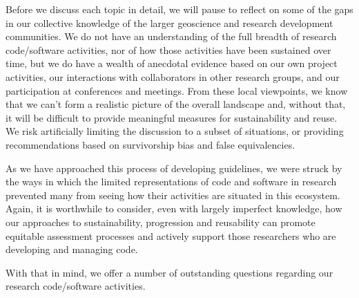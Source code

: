 \documentclass{article}
\begin{document}
Before we discuss each topic in detail, we will pause to reflect on some of the gaps in our collective knowledge of the larger geoscience and research development communities. We do not have an understanding of the full breadth of research code/software activities, nor of how those activities have been sustained over time, but we do have a wealth of anecdotal evidence based on our own project activities, our interactions with collaborators in other research groups, and our participation at conferences and meetings. From these local viewpoints, we know that we can’t form a realistic picture of the overall landscape and, without that, it will be difficult to provide meaningful measures for sustainability and reuse. We risk artificially limiting the discussion to a subset of situations, or providing recommendations based on survivorship bias and false equivalencies. 
 
As we have approached this process of developing guidelines, we were struck by the ways in which the limited representations of code and software in research prevented many from seeing how their activities are situated in this ecosystem. Again, it is worthwhile to consider, even with largely imperfect knowledge, how our approaches to sustainability, progression and reusability can promote equitable assessment processes and actively support those researchers who are developing and managing code.
 
With that in mind, we offer a number of outstanding questions regarding our research code/software activities.
\end{document}
